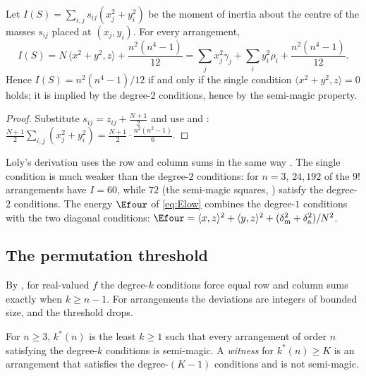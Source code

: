 \begin{corollary}
\label{cor:loly}
Let $I(S)=\sum_{i,j}s_{ij}(x_{j}^{2}+y_{i}^{2})$ be the moment of inertia about the centre of the masses $s_{ij}$ placed at $(x_j,y_i)$.  For every arrangement,
\begin{equation}
I(S)=N\,\langle x^{2}+y^{2},z\rangle+\frac{n^{2}(n^{4}-1)}{12}
=\sum_j x_j^{2}\gamma_j+\sum_i y_i^{2}\rho_i+\frac{n^{2}(n^{4}-1)}{12}.
\label{eq:loly_identity}
\end{equation}
Hence $I(S)=n^{2}(n^{4}-1)/12$ if and only if the single condition $\langle x^2+y^2,z\rangle=0$ holds; it is implied by the degree-$2$ conditions, hence by the semi-magic property.
\end{corollary}

\begin{proof}
Substitute $s_{ij}=z_{ij}+\frac{N+1}2$ and use  and : $\frac{N+1}2\sum_{i,j}(x_j^{2}+y_i^{2})=\frac{N+1}2\cdot\frac{n^{2}(n^{2}-1)}{6}$.
\end{proof}

Loly's derivation uses the row and column sums in the same way \cite{loly2004invariance}.
The single condition is much weaker than the degree-$2$ conditions: for $n=3$, $24{,}192$ of the $9!$ arrangements have $I=60$, while $72$ (the semi-magic squares, ) satisfy the degree-$2$ conditions.
The energy $\Efour$ of \eqref{eq:Elow} combines the degree-$1$ conditions with the two diagonal conditions: $\Efour=\langle x,z\rangle^2+\langle y,z\rangle^2+(\delta_{\mathrm m}^2+\delta_{\mathrm a}^2)/N^2$.

\subsection{The permutation threshold}
\label{sec:kstar}

By , for real-valued $f$ the degree-$k$ conditions force equal row and column sums exactly when $k\ge n-1$.
For arrangements the deviations are integers of bounded size, and the threshold drops.

\begin{definition}
\label{def:kstar}
For $n\ge3$, $k^*(n)$ is the least $k\ge1$ such that every arrangement of order $n$ satisfying the degree-$k$ conditions is semi-magic.
A \emph{witness} for $k^*(n)\ge K$ is an arrangement that satisfies the degree-$(K-1)$ conditions and is not semi-magic.
\end{definition}

